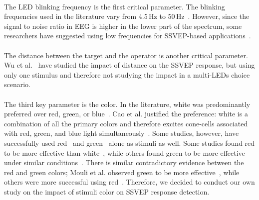 \documentclass[smallextended]{svjour3}
\begin{document}
\\
The LED blinking frequency is the first critical parameter. The blinking frequencies used in the literature vary from 4.5\,Hz to 50\,Hz~\cite{Zhu2010}. However, since the signal to noise ratio in EEG is higher in the lower part of the spectrum, some researchers have suggested using low frequencies for SSVEP-based applications~\cite{paper6}.\\
\\
The distance between the target and the operator is another critical parameter. Wu et al.~\cite{wu2013effect} have studied the impact of distance on the SSVEP response, but using only one stimulus and therefore not studying the impact in a multi-LEDs choice scenario.\\
\\
The third key parameter is the color. 
In the literature, white was predominantly preferred over red, green, or blue~\cite{paper6,aljshamee2014beyond,aljshamee2016discriminate,cao2012flashing,paper2}. Cao et al. justified the preference: white is a combination of all the primary colors and therefore excites cone-cells associated with red, green, and blue light simultaneously~\cite{cao2012flashing}. 
Some studies, however, have successfully used red~\cite{Faller2010,jian2014improving,paper4} and green~\cite{chua2004effects,duvinage2013performance,SSVEPfiability,hvaring2014comparison,paper4,mouli2013performance} alone as stimuli as well. Some studies found red to be more effective than white~\cite{Faller2010,hvaring2014comparison}, while others found green to be more effective under similar conditions~\cite{chua2004effects,duvinage2013performance}. 
There is similar contradictory evidence between the red and green colors; Mouli et al. observed green to be more effective~\cite{mouli2013performance}, while others were more successful using red~\cite{cao2012flashing}. Therefore, we decided to conduct our own study on the impact of stimuli color on SSVEP response detection.


\end{document}
